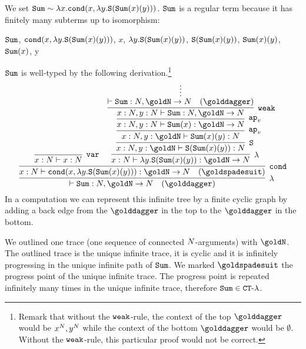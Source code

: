 \begin{Eg}
\label{example-sum}
We set ${\tt Sum} \sim \lambda x.{\tt cond}(x,\lambda y.{\tt S}({\tt Sum}(x)(y)))$.
${\tt Sum}$ is a regular term because it has finitely many subterms up to isomorphism: 
\begin{center}
  ${\tt Sum}$,
  \quad
  ${\tt cond}(x,\lambda y.{\tt S}({\tt Sum}(x)(y)))$,
  \quad
  $x$,
  \quad
  $\lambda y.{\tt S}({\tt Sum}(x)(y))$,
 \quad
  ${\tt S}({\tt Sum}(x)(y))$,
  \quad
  ${\tt Sum}(x)(y)$,
  \quad
  ${\tt Sum}(x)$,
  \quad
   y
\end{center}
${\tt Sum}$ is well-typed by the following derivation.\footnote{Remark that without the 
${\tt weak}$-rule, the context of the top $\golddagger$ would be $x^{N}, y^{N}$ 
while the context of the bottom $\golddagger$ would be $\emptyset$. 
Without the ${\tt weak}$-rule, this particular proof would not be correct.}
\[
\infer[\lambda]{
  \vdash \Sum:\N, 
  \goldN
  \rightarrow \N 
   \quad (\golddagger)
}{
  \infer[\cond]{
    x : \N \vdash 
    \cond(x,\lambda y.\Succ(\Sum(x)(y))): \goldN \rightarrow \N
     \quad (\goldspadesuit)
  }{
    \infer[\var]{
      x : \N \vdash x : \N
    }{}
    &
    \infer[\lambda]{
      x:\N \vdash \lambda y.\Succ(\Sum(x)(y)): \goldN \rightarrow \N  
    }{
      \infer[\Succ]{
        x:\N, y : \goldN 
        \vdash \Succ(\Sum(x)(y)): \N  
      }{
        \infer[\apvar]{
          x:\N, y : \goldN 
          \vdash \Sum(x)(y): \N
        }{
          \infer[\apvar]{
            x:\N,  y : \N
            \vdash \Sum(x): \goldN \rightarrow \N
          }{
            \infer[\weak]{
              x:\N,  y : \N
              \vdash \Sum: \N, \goldN \rightarrow  \N
            }{
              \infer*{\vdash \Sum: \N, \goldN \rightarrow \N 
                \quad (\golddagger)}{}
            }
          }
        }
      }
    }
  }
}
\]
In a computation we can represent this infinite tree by a finite cyclic graph
by adding a back edge from the  $\golddagger$ in the top to the $\golddagger$ in the 
bottom. 
\end{Eg}

We %
outlined one trace (one sequence of connected ${N}$-arguments)
with $\goldN$. The outlined trace is the unique 
infinite trace, it is cyclic and it is infinitely progressing in the unique infinite path
of ${\tt Sum}$.
We marked $\goldspadesuit$ the progress point of the unique infinite trace.
The progress point is repeated infinitely many times in the unique infinite trace,
therefore ${\tt Sum} \in { {\tt CT}\mbox{-}\lambda}$. 


